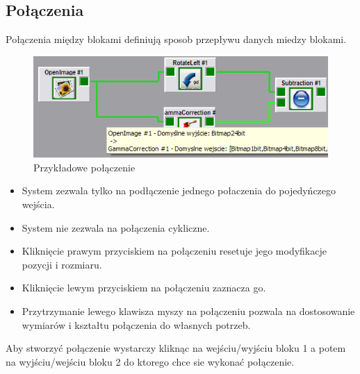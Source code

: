 \documentclass[a4paper,10pt]{article}
\begin{document}
\subsection{Połączenia}
Połączenia między blokami definiują sposob przepływu danych miedzy blokami.
\begin{figure}[h]
 \centering
 \includegraphics[scale=0.5]{polaczenie.png}
 \caption{Przykładowe połączenie}
 \label{fig:polaczenie}
\end{figure} 
\begin{itemize}
 \item System zezwala tylko na podłączenie jednego połaczenia do pojedyńczego wejścia.
 \item System nie zezwala na połączenia cykliczne.
 \item Kliknięcie prawym przyciskiem na połączeniu resetuje jego modyfikacje pozycji i rozmiaru.
 \item Kliknięcie lewym przyciskiem na połączeniu zaznacza go.
 \item Przytrzymanie lewego klawisza myszy na połączeniu pozwala na dostosowanie wymiarów i kształtu połączenia do własnych potrzeb.
\end{itemize}
Aby stworzyć połączenie wystarczy kliknąc na wejściu/wyjściu bloku 1 a potem na wyjściu/wejściu bloku 2 do ktorego chce sie wykonać połączenie.
\end{document}
